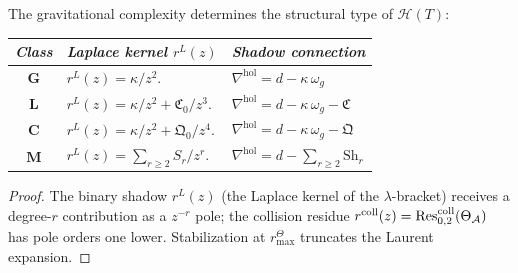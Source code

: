 \begin{theorem}
\ClaimStatusProvedHere
{}
The gravitational complexity determines the structural type of
$\mathcal{H}(T)$:
\begin{center}
\small
\renewcommand{\arraystretch}{1.25}
\begin{tabular}{c@{\quad}l@{\quad}l}
\toprule
\emph{Class} & \emph{Laplace kernel $r^L(z)$} &
\emph{Shadow connection} \\
\midrule
$\mathbf{G}$ &
 $r^L(z) = \kappa/z^2$. &
 $\nabla^{\mathrm{hol}} = d - \kappa\,\omega_g$ \\
$\mathbf{L}$ &
 $r^L(z) = \kappa/z^2 + \mathfrak{C}_0/z^3$. &
 $\nabla^{\mathrm{hol}} = d - \kappa\,\omega_g -
 \mathfrak{C}$ \\
$\mathbf{C}$ &
 $r^L(z) = \kappa/z^2 + \mathfrak{Q}_0/z^4$. &
 $\nabla^{\mathrm{hol}} = d - \kappa\,\omega_g -
 \mathfrak{Q}$ \\
$\mathbf{M}$ &
 $r^L(z) = \sum_{r\geq 2} S_r/z^r$. &
 $\nabla^{\mathrm{hol}} = d -
 \sum_{r\geq 2} \mathrm{Sh}_r$ \\
\bottomrule
\end{tabular}
\end{center}
\end{theorem}

\begin{proof}
The binary shadow $r^L(z)$ (the Laplace kernel of the
$\lambda$-bracket) receives a degree-$r$ contribution as a
$z^{-r}$ pole; the collision residue
$r^{\mathrm{coll}}(z) = \operatorname{Res}^{\mathrm{coll}}_{0,2}(\Theta_{\mathcal{A}})$
has pole orders one lower.
Stabilization at \(r^\Theta_{\max}\) truncates the Laurent expansion.
\end{proof}


